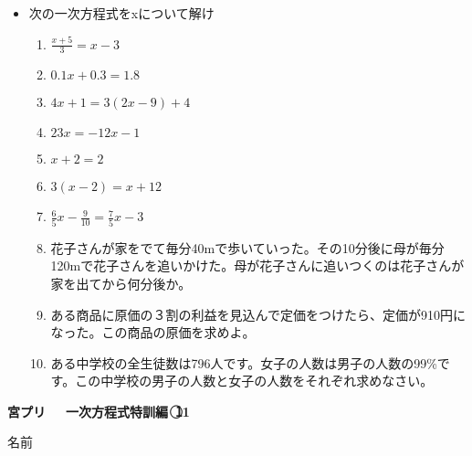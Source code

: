 \documentclass[a4paper,fleqn,papersize,15pt]{jsarticle}
\begin{document}
 \begin{itemize}
   \item 次の一次方程式をxについて解け
   \begin{enumerate}
\item $\frac{x+5}{3} =x-3$ \begin{flushright}\framebox[8em]{\rule{0pt}{6ex}}\end{flushright} %
\item $0.1x+0.3=1.8$ \begin{flushright}\framebox[8em]{\rule{0pt}{6ex}}\end{flushright} %
\item $4x+1=3(2x-9)+4$ \begin{flushright}\framebox[8em]{\rule{0pt}{6ex}}\end{flushright} %
\item $23x=-12x-1$ \begin{flushright}\framebox[8em]{\rule{0pt}{6ex}}\end{flushright} %
\item $x+2=2$ \begin{flushright}\framebox[8em]{\rule{0pt}{6ex}}\end{flushright} %
\item $3(x-2)=x+12$ \begin{flushright}\framebox[8em]{\rule{0pt}{6ex}}\end{flushright} %
\item $\frac{6}{5} x- \frac{9}{10} = \frac{7}{5} x-3$ \begin{flushright}\framebox[8em]{\rule{0pt}{6ex}}\end{flushright} %
\item 花子さんが家をでて毎分40mで歩いていった。その10分後に母が毎分120mで花子さんを追いかけた。母が花子さんに追いつくのは花子さんが家を出てから何分後か。 \vfill \begin{flushright}\framebox[8em]{\rule{0pt}{6ex}}\end{flushright} %
\item ある商品に原価の３割の利益を見込んで定価をつけたら、定価が910円になった。この商品の原価を求めよ。 \vfill \begin{flushright}\framebox[8em]{\rule{0pt}{6ex}}\end{flushright} %
\item ある中学校の全生徒数は796人です。女子の人数は男子の人数の99\%です。この中学校の男子の人数と女子の人数をそれぞれ求めなさい。 \vfill \begin{flushright}\framebox[8em]{\rule{0pt}{6ex}}\end{flushright} %
\end{enumerate}
    \vfill
\end{itemize}
\clearpage
 \begin{center}
   \LARGE\textbf{宮プリ　~一次方程式特訓編~\textcircled{\scriptsize 11}}
     \begin{flushright}
       名前\underline{\hspace{8zw}}
     \end{flushright}
 \end{center}
\end{document}
